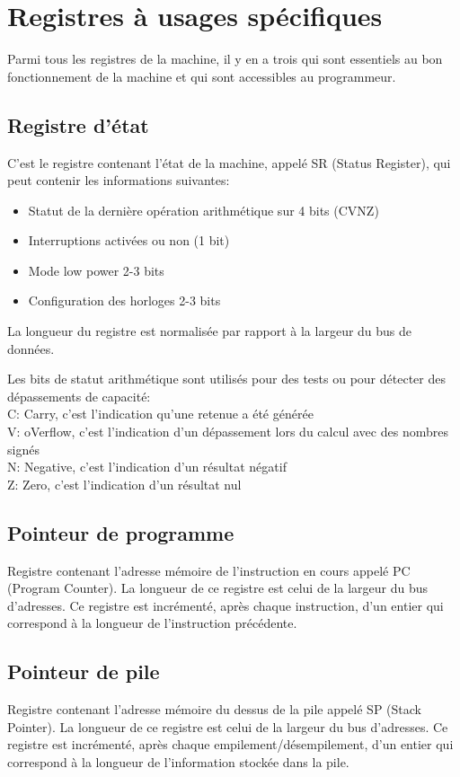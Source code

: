 \section{Registres à usages spécifiques}
Parmi tous les registres de la machine, il y en a trois qui sont essentiels au bon fonctionnement de la machine et qui sont accessibles au programmeur.

\subsection{Registre d'état}
C'est le registre contenant l'état de la machine, appelé SR (Status Register), qui peut contenir les informations suivantes:
\begin{itemize}
\item Statut de la dernière opération arithmétique sur 4 bits (CVNZ)
\item Interruptions activées ou non (1 bit)
\item Mode low power 2-3 bits
\item Configuration des horloges 2-3 bits
\end{itemize}
La longueur du registre est normalisée par rapport à la largeur du bus de données.

Les bits de statut arithmétique sont utilisés pour des tests ou pour détecter des dépassements de capacité:\\
C: Carry, c'est l'indication qu'une retenue a été générée\\
V: oVerflow, c'est l'indication d'un dépassement lors du calcul avec des nombres signés\\
N: Negative, c'est l'indication d'un résultat négatif\\
Z: Zero, c'est l'indication d'un résultat nul

\subsection{Pointeur de programme}
Registre contenant l'adresse mémoire de l'instruction en cours appelé PC (Program Counter). La longueur de ce registre est celui de la largeur du bus d'adresses. Ce registre est incrémenté, après chaque instruction, d'un entier qui correspond à la longueur de l'instruction précédente.

\subsection{Pointeur de pile}
Registre contenant l'adresse mémoire du dessus de la pile appelé SP (Stack Pointer). La longueur de ce registre est celui de la largeur du bus d'adresses. Ce registre est incrémenté, après chaque empilement/désempilement, d'un entier qui correspond à la longueur de l'information stockée dans la pile.

